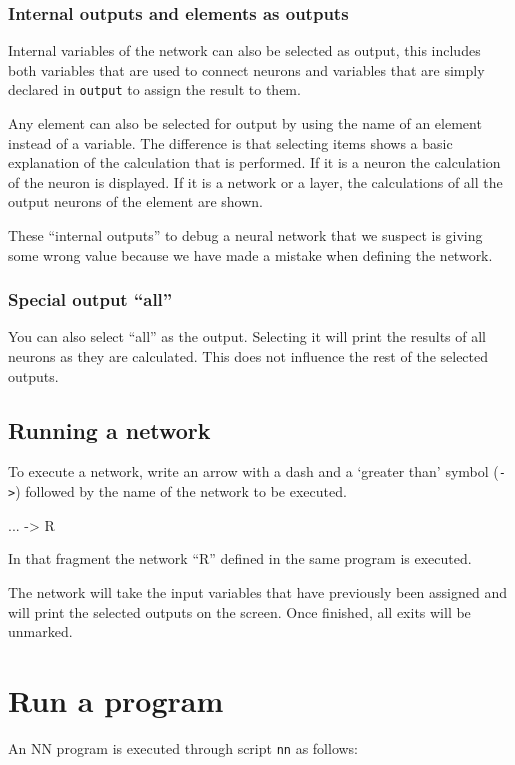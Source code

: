 \documentclass[a4paper]{article}
\begin{document}
\subsubsection{Internal outputs and elements as outputs} \label{salidas_internas}
Internal variables of the network can also be selected as output, this includes both variables that are used to connect neurons and variables that are simply declared in \texttt{output} to assign the result to them.

Any element can also be selected for output by using the name of an element instead of a variable. The difference is that selecting items shows a basic explanation of the calculation that is performed. If it is a neuron the calculation of the neuron is displayed. If it is a network or a layer, the calculations of all the output neurons of the element are shown.

These ``internal outputs'' to debug a neural network that we suspect is giving some wrong value because we have made a mistake when defining the network.

\subsubsection{Special output ``all''} \label{all}
You can also select ``all'' as the output. Selecting it will print the results of all neurons as they are calculated. This does not influence the rest of the selected outputs.

\subsection{Running a network}
To execute a network, write an arrow with a dash and a `greater than' symbol (\texttt{->}) followed by the name of the network to be executed.

\begin{codebox}
...
-> R
\end{codebox}

In that fragment the network ``R'' defined in the same program is executed.

The network will take the input variables that have previously been assigned and will print the selected outputs on the screen. Once finished, all exits will be unmarked.

\section{Run a program}
An NN program is executed through script \texttt{nn} as follows:
\end{document}
